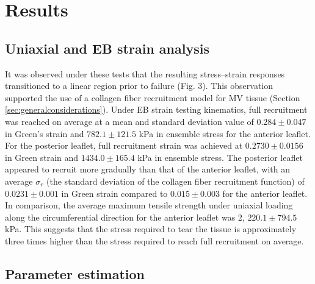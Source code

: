 \section{Results}

\subsection{Uniaxial and EB strain analysis} \label{c2:sec:uniaxialandEBresults}

    It was observed under these tests that the resulting stress–strain responses transitioned to a linear region prior to failure (Fig. 3). This observation supported the use of a collagen fiber recruitment model for MV tissue (Section \ref{sec:generalconsiderations}). Under EB strain testing kinematics, full recruitment was reached on average at a mean and standard deviation value of $0.284\pm0.047$ in Green’s strain and $782.1\pm121.5$ kPa in ensemble stress for the anterior leaflet. For the posterior leaflet, full recruitment strain was achieved at $0.2730\pm0.0156$ in Green strain and $1434.0\pm165.4$ kPa in ensemble stress. The posterior leaflet appeared to recruit more gradually than that of the anterior leaflet, with an average $\sigma_r$ (the standard deviation of the collagen fiber recruitment function) of $0.0231\pm0.001$ in Green strain compared to $0.015\pm0.003$ for the anterior leaflet. In comparison, the average maximum tensile strength under uniaxial loading along the circumferential direction for the anterior leaflet was 2, $220.1\pm794.5$ kPa. This suggests that the stress required to tear the tissue is approximately three times higher than the stress required to reach full recruitment on average.
    

\subsection{Parameter estimation}


